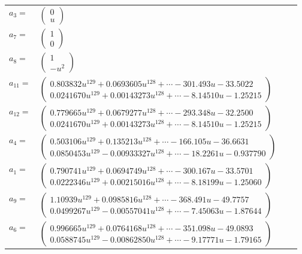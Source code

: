 \documentclass[1p]{elsarticle_modified}
\theoremstyle{definition}
\begin{document}
\begin{tabular}{m{7pt} m{180pt} m{7pt} m{180pt} }
\flushright $a_{3}=$&$\begin{pmatrix}0\\u\end{pmatrix}$ \\
\flushright $a_{7}=$&$\begin{pmatrix}1\\0\end{pmatrix}$ \\
\flushright $a_{8}=$&$\begin{pmatrix}1\\- u^2\end{pmatrix}$ \\
\flushright $a_{11}=$&$\begin{pmatrix}0.803832 u^{129}+0.0693605 u^{128}+\cdots-301.493 u-33.5022\\0.0241670 u^{129}+0.00143273 u^{128}+\cdots-8.14510 u-1.25215\end{pmatrix}$ \\
\flushright $a_{12}=$&$\begin{pmatrix}0.779665 u^{129}+0.0679277 u^{128}+\cdots-293.348 u-32.2500\\0.0241670 u^{129}+0.00143273 u^{128}+\cdots-8.14510 u-1.25215\end{pmatrix}$ \\
\flushright $a_{4}=$&$\begin{pmatrix}0.503106 u^{129}+0.135213 u^{128}+\cdots-166.105 u-36.6631\\0.0850453 u^{129}-0.00933327 u^{128}+\cdots-18.2261 u-0.937790\end{pmatrix}$ \\
\flushright $a_{1}=$&$\begin{pmatrix}0.790741 u^{129}+0.0694749 u^{128}+\cdots-300.167 u-33.5701\\0.0222346 u^{129}+0.00215016 u^{128}+\cdots-8.18199 u-1.25060\end{pmatrix}$ \\
\flushright $a_{9}=$&$\begin{pmatrix}1.10939 u^{129}+0.0985816 u^{128}+\cdots-368.491 u-49.7757\\0.0499267 u^{129}-0.00557041 u^{128}+\cdots-7.45063 u-1.87644\end{pmatrix}$ \\
\flushright $a_{6}=$&$\begin{pmatrix}0.996665 u^{129}+0.0764168 u^{128}+\cdots-351.098 u-49.0893\\0.0588745 u^{129}-0.00862850 u^{128}+\cdots-9.17771 u-1.79165\end{pmatrix}$ \\

\end{tabular}
\end{document}
